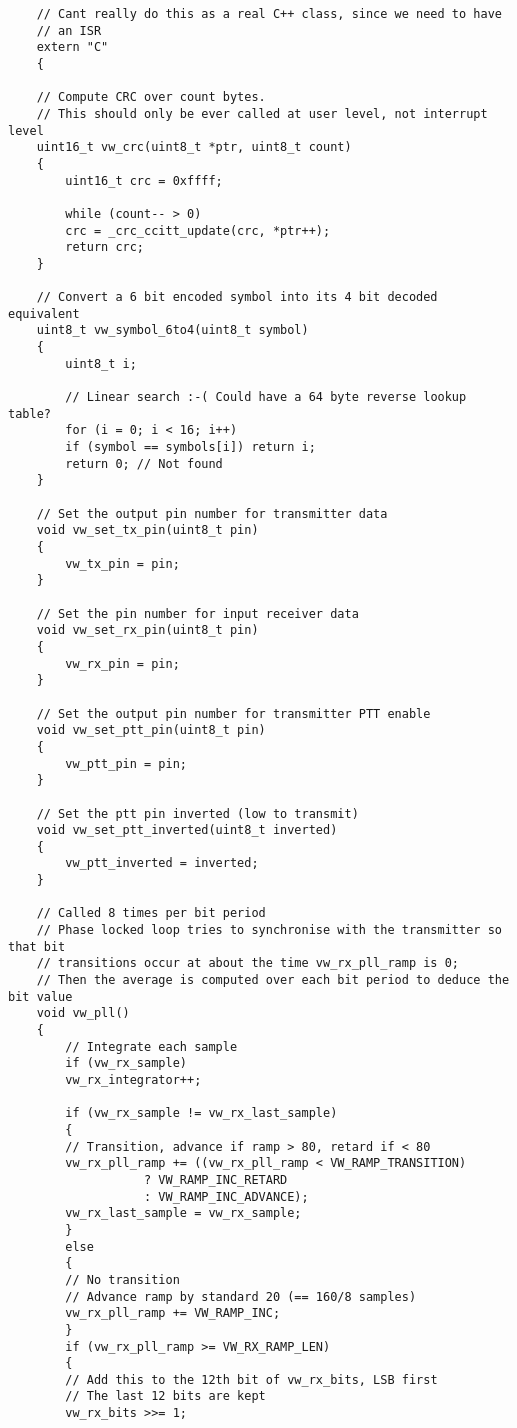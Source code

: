 \begin{verbatim}
    // Cant really do this as a real C++ class, since we need to have 
    // an ISR
    extern "C"
    {

    // Compute CRC over count bytes.
    // This should only be ever called at user level, not interrupt level
    uint16_t vw_crc(uint8_t *ptr, uint8_t count)
    {
        uint16_t crc = 0xffff;

        while (count-- > 0) 
        crc = _crc_ccitt_update(crc, *ptr++);
        return crc;
    }

    // Convert a 6 bit encoded symbol into its 4 bit decoded equivalent
    uint8_t vw_symbol_6to4(uint8_t symbol)
    {
        uint8_t i;
        
        // Linear search :-( Could have a 64 byte reverse lookup table?
        for (i = 0; i < 16; i++)
        if (symbol == symbols[i]) return i;
        return 0; // Not found
    }

    // Set the output pin number for transmitter data
    void vw_set_tx_pin(uint8_t pin)
    {
        vw_tx_pin = pin;
    }

    // Set the pin number for input receiver data
    void vw_set_rx_pin(uint8_t pin)
    {
        vw_rx_pin = pin;
    }

    // Set the output pin number for transmitter PTT enable
    void vw_set_ptt_pin(uint8_t pin)
    {
        vw_ptt_pin = pin;
    }

    // Set the ptt pin inverted (low to transmit)
    void vw_set_ptt_inverted(uint8_t inverted)
    {
        vw_ptt_inverted = inverted;
    }

    // Called 8 times per bit period
    // Phase locked loop tries to synchronise with the transmitter so that bit 
    // transitions occur at about the time vw_rx_pll_ramp is 0;
    // Then the average is computed over each bit period to deduce the bit value
    void vw_pll()
    {
        // Integrate each sample
        if (vw_rx_sample)
        vw_rx_integrator++;

        if (vw_rx_sample != vw_rx_last_sample)
        {
        // Transition, advance if ramp > 80, retard if < 80
        vw_rx_pll_ramp += ((vw_rx_pll_ramp < VW_RAMP_TRANSITION) 
                   ? VW_RAMP_INC_RETARD 
                   : VW_RAMP_INC_ADVANCE);
        vw_rx_last_sample = vw_rx_sample;
        }
        else
        {
        // No transition
        // Advance ramp by standard 20 (== 160/8 samples)
        vw_rx_pll_ramp += VW_RAMP_INC;
        }
        if (vw_rx_pll_ramp >= VW_RX_RAMP_LEN)
        {
        // Add this to the 12th bit of vw_rx_bits, LSB first
        // The last 12 bits are kept
        vw_rx_bits >>= 1;


\end{verbatim}
